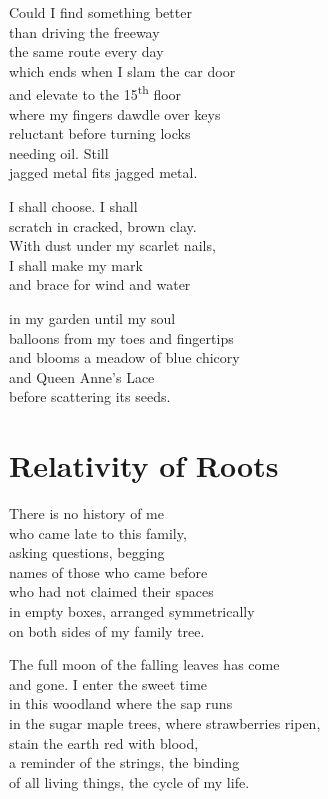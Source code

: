 \documentclass[twoside,10pt]{book}
\begin{document}
Could I find something better\\
than driving the freeway\\
the same route every day\\
which ends when I slam the car door\\
and elevate to the 15\textsuperscript{th} floor\\
where my fingers dawdle over keys\\
reluctant before turning locks\\
needing oil. Still\\
jagged metal fits jagged metal.

I shall choose. I shall\\
scratch in cracked, brown clay.\\
With dust under my scarlet nails,\\
I shall make my mark\\
and brace for wind and water

in my garden until my soul\\
balloons from my toes and fingertips\\
and blooms a meadow of blue chicory\\
and Queen Anne's Lace\\
before scattering its seeds.


\clearpage
\section{Relativity of Roots}

There is no history of me\\
who came late to this family,\\
asking questions, begging\\
names of those who came before\\
who had not claimed their spaces\\
in empty boxes, arranged symmetrically\\
on both sides of my family tree.

The full moon of the falling leaves has come\\
and gone. I enter the sweet time\\
in this woodland where the sap runs\\
in the sugar maple trees, where strawberries ripen,\\
stain the earth red with blood,\\
a reminder of the strings, the binding\\
of all living things, the cycle of my life.
\end{document}
